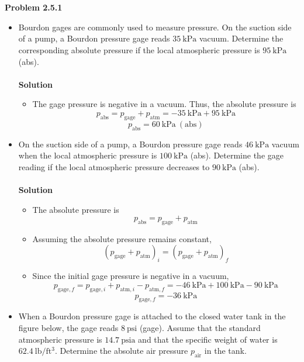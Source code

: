 ﻿\documentclass[12pt]{article}
\begin{document}
\section*{}
\textbf{Problem 2.5.1}
\begin{itemize}
    \item[(a)] Bourdon gages are commonly used to measure pressure. On the suction side of a pump, a Bourdon pressure gage reads $35\ \mathrm{kPa}$ vacuum. Determine the corresponding absolute pressure if the local atmospheric pressure is $95\ \mathrm{kPa}$ (abs).\\\\
\textbf{Solution}
\begin{itemize}
\item The gage pressure is negative in a vacuum. Thus, the absolute pressure is
\[
p_{\mathrm{abs}}=p_{\mathrm{gage}}+p_{\mathrm{atm}}
=-35\ \mathrm{kPa}+95\ \mathrm{kPa}
\]
\[
\boxed{p_{\mathrm{abs}}=60\ \mathrm{kPa}\ (\mathrm{abs})}
\]
\end{itemize}
    \item[(b)] On the suction side of a pump, a Bourdon pressure gage reads $46\ \mathrm{kPa}$ vacuum when the local atmospheric pressure is $100\ \mathrm{kPa}$ (abs). Determine the gage reading if the local atmospheric pressure decreases to $90\ \mathrm{kPa}$ (abs).\\\\
\textbf{Solution}
\begin{itemize}
\item The absolute pressure is
\[
p_{\mathrm{abs}}=p_{\mathrm{gage}}+p_{\mathrm{atm}}
\]
\item Assuming the absolute pressure remains constant,
\[
(p_{\mathrm{gage}}+p_{\mathrm{atm}})_i=(p_{\mathrm{gage}}+p_{\mathrm{atm}})_f
\]
\item Since the initial gage pressure is negative in a vacuum,
\[
p_{\mathrm{gage},f}=p_{\mathrm{gage},i}+p_{\mathrm{atm},i}-p_{\mathrm{atm},f}
=-46\ \mathrm{kPa}+100\ \mathrm{kPa}-90\ \mathrm{kPa}
\]
\[
\boxed{p_{\mathrm{gage},f}=-36\ \mathrm{kPa}}
\]
\end{itemize}
    \item[(c)] When a Bourdon pressure gage is attached to the closed water tank in the figure below, the gage reads $8\ \mathrm{psi}$ (gage). Assume that the standard atmospheric pressure is $14.7\ \mathrm{psia}$ and that the specific weight of water is $62.4\ \mathrm{lb/ft^3}$. Determine the absolute air pressure $p_{\mathrm{air}}$ in the tank.
\begin{center}

\end{center}
\end{itemize}
\end{document}
